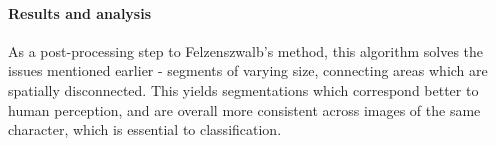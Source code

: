 \paragraph{Results and analysis} As a post-processing step to Felzenszwalb's method, this algorithm solves the issues mentioned earlier - segments of varying size, connecting areas which are spatially disconnected. This yields segmentations which correspond better to human perception, and are overall more consistent across images of the same character, which is essential to classification.